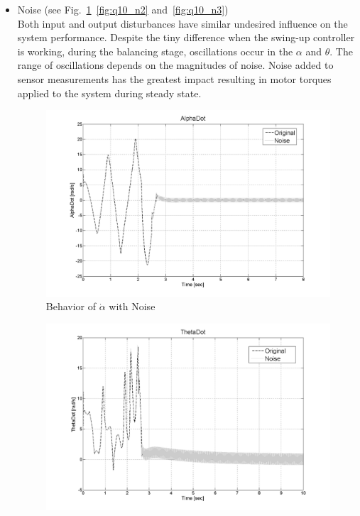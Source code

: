 \documentclass{article}
\theoremstyle{plain}
\theoremstyle{definition}
\theoremstyle{remark}
\begin{document}
\begin{itemize}
\item Noise (see Fig.~\ref{fig:q10_n1}~\ref{fig:q10_n2} and~\ref{fig:q10_n3})\\
Both input and output disturbances have similar undesired influence on the system performance. Despite the tiny difference when the swing-up controller is working, during the balancing stage, oscillations occur in the $\alpha$ and $\theta$. The range of oscillations depends on the magnitudes of noise. Noise added to sensor measurements has the greatest impact resulting in motor torques applied to the system during steady state.  

\begin{figure}[h]
\includegraphics[width=1\textwidth]{q10_n1.png}
\caption{Behavior of $\dot{\alpha}$ with Noise} \label{tex}
\label{fig:q10_n1}
\end{figure}
\begin{figure}[h]
\includegraphics[width=1\textwidth]{q10_n2.png}

\end{figure}
\end{itemize}
\end{document}
